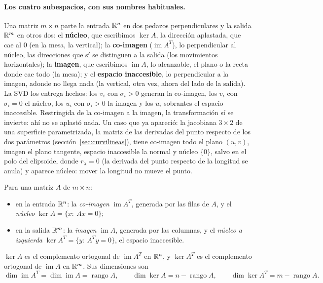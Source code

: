 \paragraph{Los cuatro subespacios, con sus nombres habituales.} Una matriz \(m\times n\)
parte la entrada \(\mathbb{R}^n\) en dos pedazos perpendiculares y la salida \(\mathbb{R}^m\) en otros dos: el
\textbf{núcleo}, que escribimos \(\ker A\), la dirección aplastada, que cae al \(0\) (en la
mesa, la vertical); la \textbf{co-imagen}
(\(\operatorname{im}A^T\)), lo perpendicular al núcleo, las direcciones que sí se distinguen a
la salida (los movimientos horizontales); la \textbf{imagen}, que escribimos
\(\operatorname{im}A\), lo alcanzable, el plano o la recta donde cae todo (la mesa); y el
\textbf{espacio inaccesible}, lo perpendicular a la imagen, adonde no llega nada (la vertical,
otra vez, ahora del lado de la salida). La SVD los entrega hechos: los \(v_i\) con \(\sigma_i>0\) generan la co-imagen, los
\(v_i\) con \(\sigma_i=0\) el núcleo, los \(u_i\) con \(\sigma_i>0\) la imagen y los
\(u_i\) sobrantes el espacio inaccesible. Restringida de la co-imagen a la imagen, la
transformación sí se invierte: ahí no se aplastó nada. Un caso que ya apareció: la jacobiana
\(3\times2\) de una superficie parametrizada, la matriz de las derivadas del punto respecto
de los dos parámetros (sección~\ref{sec:curvilineas}), tiene
co-imagen todo el plano \((u,v)\), imagen el plano tangente, espacio inaccesible la normal
y núcleo \(\{0\}\), salvo en el polo del elipsoide, donde \(r_\lambda=0\) (la derivada del
punto respecto de la longitud se anula) y aparece núcleo: mover la longitud no mueve el
punto.

\begin{definicion}\label{def:cuatro-subespacios}
Para una matriz \(A\) de \(m\times n\):
\begin{itemize}
  \item en la entrada \(\mathbb{R}^n\): la \emph{co-imagen} \(\operatorname{im}A^T\), generada por
  las filas de \(A\), y el \emph{núcleo} \(\ker A=\{x:\ Ax=0\}\);
  \item en la salida \(\mathbb{R}^m\): la \emph{imagen} \(\operatorname{im}A\), generada por las
  columnas, y el \emph{núcleo a izquierda} \(\ker A^T=\{y:\ A^Ty=0\}\), el espacio
  inaccesible.
\end{itemize}
\end{definicion}

\begin{proposicion}\label{prop:cuatro-subespacios}
\(\ker A\) es el complemento ortogonal de \(\operatorname{im}A^T\) en \(\mathbb{R}^n\), y
\(\ker A^T\) es el complemento ortogonal de \(\operatorname{im}A\) en \(\mathbb{R}^m\). Sus
dimensiones son
\[
  \dim\operatorname{im}A^T=\dim\operatorname{im}A=\operatorname{rango}A,\qquad
  \dim\ker A=n-\operatorname{rango}A,\qquad \dim\ker A^T=m-\operatorname{rango}A .
\]
\end{proposicion}

